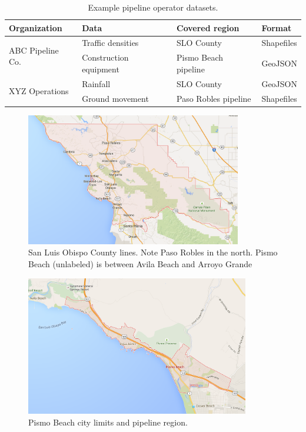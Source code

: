 \begin{table}[ht]

\begin{tabular}{ |l|l|l|l| }
\hline
Organization & Data & Covered region & Format\\
\hline
\multirow{2}{*}{ABC Pipeline Co.}
 & Traffic densities & SLO County & Shapefiles \\ \cline{2-4}
 & Construction equipment & Pismo Beach pipeline & GeoJSON \\ \hline
\multirow{2}{*}{XYZ Operations}
 & Rainfall & SLO County & GeoJSON \\ \cline{2-4}
 & Ground movement & Paso Robles pipeline & Shapefiles \\ \hline
\end{tabular}
\caption{Example pipeline operator datasets.}
\label{table:layers}
\end{table}

\begin{figure}[ht]
    \centering
    \includegraphics[width=0.84\textwidth]{figures/county.png}
    \caption{San Luis Obispo County lines. Note Paso Robles in the north. Pismo Beach (unlabeled) is between Avila Beach and Arroyo Grande}
    \label{fig:county}
\end{figure}

\begin{figure}[ht]
    \centering
    \includegraphics[width=0.87\textwidth]{figures/pismo.png}
    \caption{Pismo Beach city limits and pipeline region.}
    \label{fig:pismo}
\end{figure}

